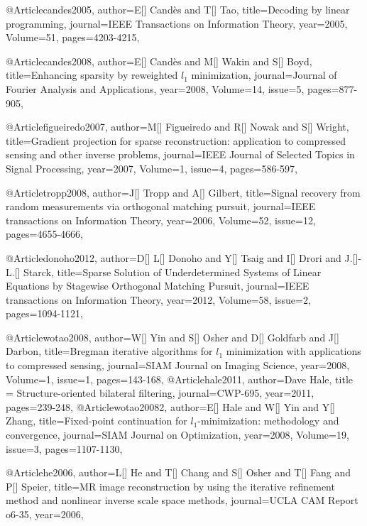 {@Article{candes2005,
  author={E[] Cand\`{e}s and T[] Tao},
  title={Decoding by linear programming},
  journal={IEEE Transactions on Information Theory},
  year=2005,
  Volume=51,
  pages={4203-4215},
}

@Article{candes2008,
  author={E[] Cand\`{e}s and M[] Wakin and S[] Boyd},
  title={Enhancing sparsity by reweighted $l_1$ minimization},
  journal={Journal of {F}ourier Analysis and Applications},
  year=2008,
  Volume=14,
  issue=5,
  pages={877-905},
}

@Article{figueiredo2007,
  author={M[] Figueiredo and R[] Nowak and S[] Wright},
  title={Gradient projection for sparse reconstruction: application to compressed sensing and other inverse problems},
  journal={IEEE Journal of Selected Topics in Signal Processing},
  year=2007,
  Volume=1,
  issue=4,
  pages={586-597},
}


@Article{tropp2008,
  author={J[] Tropp and A[] Gilbert},
  title={Signal recovery from random measurements via orthogonal matching pursuit},
  journal={IEEE transactions on Information Theory},
  year=2006,
  Volume=52,
  issue=12,
  pages={4655-4666},
}


@Article{donoho2012,
  author={D[] L[] Donoho and Y[] Tsaig and I[] Drori and J.[]-L.[] Starck},
  title={Sparse Solution of Underdetermined Systems of Linear Equations by Stagewise Orthogonal Matching Pursuit},
  journal={IEEE transactions on Information Theory},
  year=2012,
  Volume=58,
  issue=2,
  pages={1094-1121},
}

@Article{wotao2008,
  author={W[] Yin and S[] Osher and D[] Goldfarb and J[] Darbon},
  title={Bregman iterative algorithms for $l_1$ minimization with applications to compressed sensing},
  journal={SIAM Journal on Imaging Science},
  year=2008,
  Volume=1,
  issue=1,
  pages={143-168},
}
@Article{hale2011,
  author={Dave Hale},
  title = {Structure-oriented bilateral filtering},
  journal={CWP-695},
  year=2011,
  pages={239-248},
}
@Article{wotao20082,
  author={E[] Hale and W[] Yin and Y[] Zhang},
  title={Fixed-point continuation for $l_1$-minimization: methodology and convergence},
  journal={SIAM Journal on Optimization},
  year=2008,
  Volume=19,
  issue=3,
  pages={1107-1130},
}

@Article{he2006,
  author={L[] He and T[] Chang and S[] Osher and T[] Fang and P[] Speier},
  title={MR image reconstruction by using the iterative refinement method and nonlinear inverse scale space methods},
  journal={UCLA CAM Report o6-35},
  year=2006,
}

}
